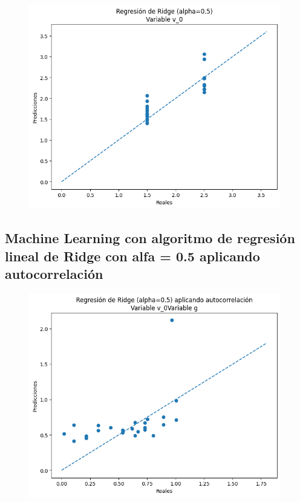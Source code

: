 \documentclass[oneside,openright,titlepage,numbers=noenddot,openany,headinclude,footinclude=true,
cleardoublepage=empty,abstractoff,BCOR=5mm,paper=a4,fontsize=12pt,main=spanish]{scrreprt}
\begin{document}
\begin{figure}[H]
	\centering
	\includegraphics[width=11cm]{Regresión de Ridge (alpha=0.5) Variable v_0.png}
\end{figure}

\subsection{Machine Learning con algoritmo de regresión lineal de Ridge con alfa = 0.5 aplicando autocorrelación}

\begin{figure}[H]
	\centering
	\includegraphics[width=11cm]{Regresión de Ridge (alpha=0.5) aplicando autocorrelación Variable g.png}
\end{figure}
\end{document}

